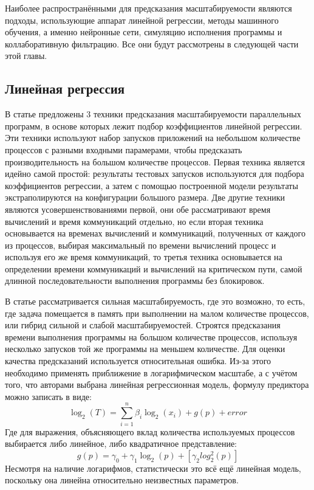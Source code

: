 	Наиболее распространёнными для предсказания масштабируемости являются подходы, использующие аппарат линейной регрессии, методы машинного обучения, а именно нейронные сети, симуляцию исполнения программы и коллаборативную фильтрацию. Все они будут рассмотрены в следующей части этой главы.

	\subsection{Линейная регрессия}
		В статье \cite{log_main} предложены 3 техники предсказания масштабируемости параллельных программ, в основе которых лежит подбор коэффициентов линейной регрессии. Эти техники используют набор запусков приложений на небольшом количестве процессов с разными входными парамерами, чтобы предсказать производительность на большом количестве процессов. Первая техника является идейно самой простой: результаты тестовых запусков используются для подбора коэффициентов регрессии, а затем с помощью построенной модели результаты экстраполируются на конфигурации большого размера. Две другие техники являются усовершенствованиями первой, они обе рассматривают время вычислений и время коммуникаций отдельно, но если вторая техника основывается на временах вычислений и коммуникаций, полученных от каждого из процессов, выбирая максимальный по времени вычислений процесс и используя его же время коммуникаций, то третья техника основывается на определении времени коммуникаций и вычислений на критическом пути, самой длинной последовательности выполнения программы без блокировок.

		В статье рассматривается сильная масштабируемость, где это возможно, то есть, где задача помещается в память при выполнении на малом количестве процессов, или гибрид сильной и слабой масштабируемостей. Строятся предсказания времени выполнения программы на большом количестве процессов, используя несколько запусков той же программы на меньшем количестве. Для оценки качества предсказаний используется относительная ошибка. Из-за этого необходимо применять приближение в логарифмическом масштабе, а с учётом того, что авторами выбрана линейная регрессионная модель, формулу предиктора можно записать в виде:
		\[
		\log_2{(T)} = \sum_{i=1}^{n}{\beta_i\log_2{(x_i)}} + g(p) + error
		\]
		Где для выражения, объясняющего вклад количества используемых процессов выбирается либо линейное, либо квадратичное представление:
		\[
		g(p) = \gamma_0 + \gamma_1\log_2(p) + [\gamma_2log_2^2(p)]
		\]
		Несмотря на наличие логарифмов, статистически это всё ещё линейная модель, поскольку она линейна относительно неизвестных параметров.


